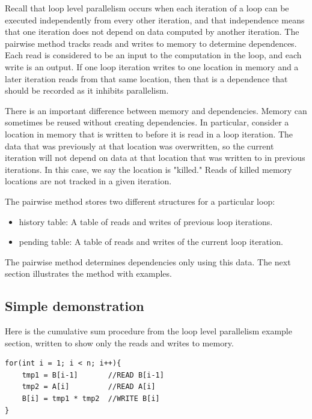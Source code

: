 \documentclass[12pt,twoside]{reedthesis}
\begin{document}
		Recall that loop level parallelism occurs when each iteration of a loop can be executed independently from every other iteration, and that independence means that one iteration does not depend on data computed by another iteration. 
		The pairwise method tracks reads and writes to memory to determine dependences. Each read is considered to be an input to the computation in the loop, and each write is an output. If one loop iteration writes to one location in memory and a later iteration reads from that same location, then that is a dependence that should be recorded as it inhibits parallelism. 
		
		There is an important difference between memory and dependencies. Memory can sometimes be reused without creating dependencies. In particular, consider a location in memory that is written to before it is read in a loop iteration. The data that was previously at that location was overwritten, so the current iteration will not depend on data at that location that was written to in previous iterations. In this case, we say the location is "killed." Reads of killed memory locations are not tracked in a given iteration.
		
		The pairwise method stores two different structures for a particular loop:
		
		\begin{itemize}
			\item history table: A table of reads and writes of previous loop iterations.
			\item pending table: A table of reads and writes of the current loop iteration.
		\end{itemize}
	
		The pairwise method determines dependencies only using this data. The next section illustrates the method with examples. 
		
		\subsection{Simple demonstration}
		
		
		Here is the cumulative sum procedure from the loop level parallelism example section, written to show only the reads and writes to memory.
			\begin{lstlisting}
for(int i = 1; i < n; i++){
	tmp1 = B[i-1]		//READ B[i-1]
	tmp2 = A[i] 		//READ A[i]
	B[i] = tmp1 * tmp2	//WRITE B[i]
}
			\end{lstlisting}
		
\end{document}
